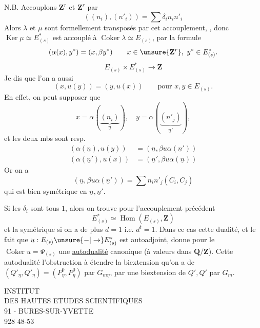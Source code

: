 N.B. Accouplons $\mathbf Z^r$ et $\mathbf Z^r$ par
\[
((n_i),(n'_i))=\sum\delta_i n_i n'_i
\]
Alors $\lambda$ et $\mu$ sont formellement transposés par cet accouplement,
, donc $\operatorname{Ker}\mu\simeq E^*_{(s)}$ est accouplé à $\operatorname{Coker}\lambda\simeq E_{(s)}$, par la formule
\[
(\alpha(x),y^*)=(x,\beta y^*)\qquad x\in\unsure{\mathbf Z^r},\ y^*\in E^*_{(s)}.
\]
\[
E_{(s)}\times E^*_{(s)}\longrightarrow\mathbf Z
\]
 Je dis que l'on a aussi
\[
(x,u(y))=(y,u(x))\qquad\text{pour }x,y\in E_{(s)}.
\]
En effet, on peut supposer que
\[
x=\alpha(\underbrace{(n_i)}_{\underline n}),\quad y=\alpha(\underbrace{(n'_j)}_{\underline n'}),
\]
et les deux mbs sont resp.
\[
\begin{aligned}
(\alpha(\underline n),u(y))&=(\underline n,\beta u\alpha(\underline n'))\\
(\alpha(\underline n'),u(x))&=(\underline n',\beta u\alpha(\underline n))
\end{aligned}
\]
Or on a
\[
(\underline n,\beta u\alpha(\underline n'))=\sum n_i n'_j(C_i,C_j)
\]
qui est bien symétrique en  $\underline n,\underline n'$.

Si les $\delta_i$ sont tous $1$, alors on trouve pour l'accouplement précédent
\[
E^*_{(s)}\simeq\operatorname{Hom}(E_{(s)},\mathbf Z)
\]
et la  symétrique si on a de plus $d=1$ i.e. $d^t=1$.
Dans ce cas cette dualité, et le fait que $u:E_{(s)}\unsure{-|\to}E^*_{(s)}$ est autoadjoint, donne pour le $\operatorname{Coker}u=\Psi_{(s)}$ une \uline{autodualité} canonique (à valeurs dans $\mathbf Q/\mathbf Z$). Cette autodualité  l'obstruction à étendre la biextension qu'on a de $(Q'_\eta,Q'_\eta)=(P^0_\eta,P^0_\eta)$ par $G_{m\eta}$, par une biextension de $Q',Q'$ par $G_m$.

\begin{center}
INSTITUT\\
DES HAUTES ETUDES SCIENTIFIQUES\\
91 - BURES-SUR-YVETTE\\
928 48-53
\end{center}

